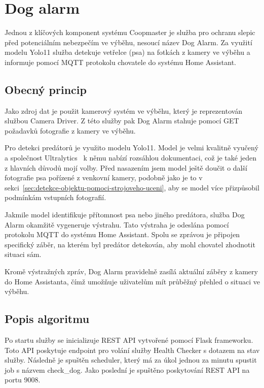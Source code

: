 \section{Dog alarm}\label{sec:dog-alarm}
Jednou z klíčových komponent systému Coopmaster je služba pro ochranu slepic před potenciálním nebezpečím ve výběhu, nesoucí název Dog Alarm.
Za využití modelu Yolo11 služba detekuje vetřelce (psa) na fotkách z kamery ve výběhu a informuje pomocí MQTT protokolu chovatele do systému Home Assistant.

\subsection*{Obecný princip}
Jako zdroj dat je použit kamerový systém ve výběhu, který je reprezentován službou Camera Driver.
Z této služby pak Dog Alarm stahuje pomocí GET požadavků fotografie z kamery ve výběhu.\newline

Pro detekci predátorů je využito modelu Yolo11.
Model je velmi kvalitně vyučený a společnost Ultralytics~\cite{ultralytics} k němu nabízí rozsáhlou dokumentaci, což je také jeden z hlavních důvodů mojí volby.
Před nasazením jsem model ještě doučit o další fotografie psa pořízené z venkovní kamery, podobně jako je to v sekci~\ref{sec:detekce-objektu-pomoci-strojoveho-uceni}, aby se model více přizpůsobil podmínkám vstupních fotografií.\newline

Jakmile model identifikuje přítomnost psa nebo jiného predátora, služba Dog Alarm okamžitě vygeneruje výstrahu.
Tato výstraha je odeslána pomocí protokolu MQTT do systému Home Assistant.
Spolu se zprávou je připojen specifický záběr, na kterém byl predátor detekován, aby mohl chovatel zhodnotit situaci sám.\newline

Kromě výstražných zpráv, Dog Alarm pravidelně zasílá aktuální záběry z kamery do Home Assistanta, čímž umožňuje uživatelům mít průběžný přehled o situaci ve výběhu.\newline

\subsection*{Popis algoritmu}
Po startu služby se inicializuje REST API vytvořené pomocí Flask frameworku.
Toto API poskytuje endpoint pro volání služby Health Checker s dotazem na stav služby.
Následně je spuštěn scheduler, který má za úkol jednou za minutu spustit job s názvem check\_dog.
Jako poslední je spuštěno poskytování REST API na portu 9008.\newline

